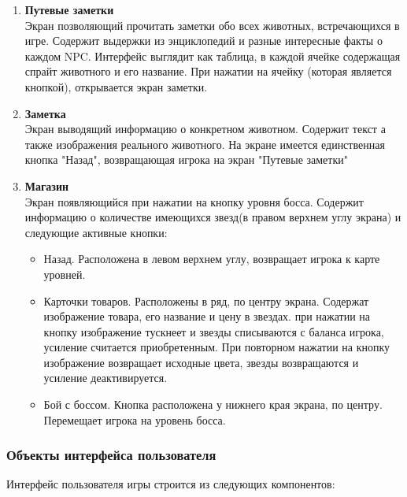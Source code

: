 \documentclass{article}
\begin{document}
\begin{enumerate}
    \item \textbf{Путевые заметки}
    \\Экран позволяющий прочитать заметки обо всех животных, встречающихся в игре. Содержит выдержки из энциклопедий и разные интересные факты о каждом NPC. Интерфейс выглядит как таблица, в каждой ячейке содержащая спрайт животного и его название. При нажатии на ячейку (которая является кнопкой), открывается экран заметки.

    \item \textbf{Заметка}
    \\Экран выводящий информацию о конкретном животном. Содержит текст а также изображения реального животного. На экране имеется единственная кнопка "Назад", возвращающая игрока на экран "Путевые заметки"

    \item \textbf{Магазин}
    \\Экран появляющийся при нажатии на кнопку уровня босса. Содержит информацию о количестве имеющихся звезд(в правом верхнем углу экрана) и следующие активные кнопки:
    \begin{itemize}
        \item Назад. Расположена в левом верхнем углу, возвращает игрока к карте уровней.
        \item Карточки товаров. Расположены в ряд, по центру экрана. Содержат изображение товара, его название и цену в звездах. при нажатии на кнопку изображение тускнеет и звезды списываются с баланса игрока, усиление считается приобретенным. При повторном нажатии на кнопку изображение возвращает исходные цвета, звезды возвращаются и усиление деактивируется.
        \item Бой с боссом. Кнопка расположена у нижнего края экрана, по центру. Перемещает игрока на уровень босса.
    \end{itemize}
\end{enumerate}

\subsubsection{Объекты интерфейса пользователя}

Интерфейс пользователя игры строится из следующих компонентов:
\end{document}
